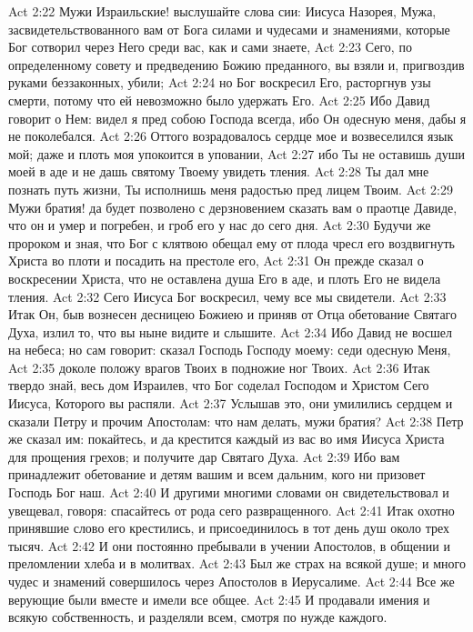 Act 2:22  Мужи Израильские! выслушайте слова сии: Иисуса Назорея, Мужа, засвидетельствованного вам от Бога силами и чудесами и знамениями, которые Бог сотворил через Него среди вас, как и сами знаете,
Act 2:23  Сего, по определенному совету и предведению Божию преданного, вы взяли и, пригвоздив руками беззаконных, убили;
Act 2:24  но Бог воскресил Его, расторгнув узы смерти, потому что ей невозможно было удержать Его.
Act 2:25  Ибо Давид говорит о Нем: видел я пред собою Господа всегда, ибо Он одесную меня, дабы я не поколебался.
Act 2:26  Оттого возрадовалось сердце мое и возвеселился язык мой; даже и плоть моя упокоится в уповании,
Act 2:27  ибо Ты не оставишь души моей в аде и не дашь святому Твоему увидеть тления.
Act 2:28  Ты дал мне познать путь жизни, Ты исполнишь меня радостью пред лицем Твоим.
Act 2:29  Мужи братия! да будет позволено с дерзновением сказать вам о праотце Давиде, что он и умер и погребен, и гроб его у нас до сего дня.
Act 2:30  Будучи же пророком и зная, что Бог с клятвою обещал ему от плода чресл его воздвигнуть Христа во плоти и посадить на престоле его,
Act 2:31  Он прежде сказал о воскресении Христа, что не оставлена душа Его в аде, и плоть Его не видела тления.
Act 2:32  Сего Иисуса Бог воскресил, чему все мы свидетели.
Act 2:33  Итак Он, быв вознесен десницею Божиею и приняв от Отца обетование Святаго Духа, излил то, что вы ныне видите и слышите.
Act 2:34  Ибо Давид не восшел на небеса; но сам говорит: сказал Господь Господу моему: седи одесную Меня,
Act 2:35  доколе положу врагов Твоих в подножие ног Твоих.
Act 2:36  Итак твердо знай, весь дом Израилев, что Бог соделал Господом и Христом Сего Иисуса, Которого вы распяли.
Act 2:37  Услышав это, они умилились сердцем и сказали Петру и прочим Апостолам: что нам делать, мужи братия?
Act 2:38  Петр же сказал им: покайтесь, и да крестится каждый из вас во имя Иисуса Христа для прощения грехов; и получите дар Святаго Духа.
Act 2:39  Ибо вам принадлежит обетование и детям вашим и всем дальним, кого ни призовет Господь Бог наш.
Act 2:40  И другими многими словами он свидетельствовал и увещевал, говоря: спасайтесь от рода сего развращенного.
Act 2:41  Итак охотно принявшие слово его крестились, и присоединилось в тот день душ около трех тысяч.
Act 2:42  И они постоянно пребывали в учении Апостолов, в общении и преломлении хлеба и в молитвах.
Act 2:43  Был же страх на всякой душе; и много чудес и знамений совершилось через Апостолов в Иерусалиме.
Act 2:44  Все же верующие были вместе и имели все общее.
Act 2:45  И продавали имения и всякую собственность, и разделяли всем, смотря по нужде каждого.
